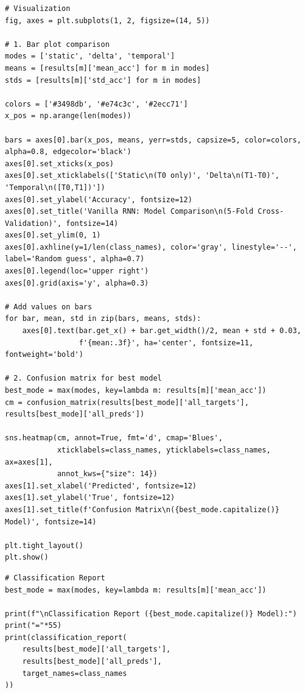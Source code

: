 \begin{lstlisting}
# Visualization
fig, axes = plt.subplots(1, 2, figsize=(14, 5))
 
# 1. Bar plot comparison
modes = ['static', 'delta', 'temporal']
means = [results[m]['mean_acc'] for m in modes]
stds = [results[m]['std_acc'] for m in modes]
 
colors = ['#3498db', '#e74c3c', '#2ecc71']
x_pos = np.arange(len(modes))
 
bars = axes[0].bar(x_pos, means, yerr=stds, capsize=5, color=colors, alpha=0.8, edgecolor='black')
axes[0].set_xticks(x_pos)
axes[0].set_xticklabels(['Static\n(T0 only)', 'Delta\n(T1-T0)', 'Temporal\n([T0,T1])'])
axes[0].set_ylabel('Accuracy', fontsize=12)
axes[0].set_title('Vanilla RNN: Model Comparison\n(5-Fold Cross-Validation)', fontsize=14)
axes[0].set_ylim(0, 1)
axes[0].axhline(y=1/len(class_names), color='gray', linestyle='--', label='Random guess', alpha=0.7)
axes[0].legend(loc='upper right')
axes[0].grid(axis='y', alpha=0.3)
 
# Add values on bars
for bar, mean, std in zip(bars, means, stds):
    axes[0].text(bar.get_x() + bar.get_width()/2, mean + std + 0.03,
                 f'{mean:.3f}', ha='center', fontsize=11, fontweight='bold')
 
# 2. Confusion matrix for best model
best_mode = max(modes, key=lambda m: results[m]['mean_acc'])
cm = confusion_matrix(results[best_mode]['all_targets'], results[best_mode]['all_preds'])
 
sns.heatmap(cm, annot=True, fmt='d', cmap='Blues',
            xticklabels=class_names, yticklabels=class_names, ax=axes[1],
            annot_kws={"size": 14})
axes[1].set_xlabel('Predicted', fontsize=12)
axes[1].set_ylabel('True', fontsize=12)
axes[1].set_title(f'Confusion Matrix\n({best_mode.capitalize()} Model)', fontsize=14)
 
plt.tight_layout()
plt.show()
\end{lstlisting}
 
\begin{lstlisting}
# Classification Report
best_mode = max(modes, key=lambda m: results[m]['mean_acc'])
 
print(f"\nClassification Report ({best_mode.capitalize()} Model):")
print("="*55)
print(classification_report(
    results[best_mode]['all_targets'],
    results[best_mode]['all_preds'],
    target_names=class_names
))
\end{lstlisting}
 

